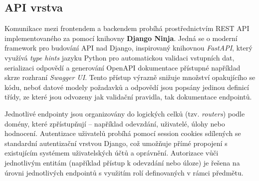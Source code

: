 \subsection{API vrstva}
\label{subsec:kelvin-api}

Komunikace mezi frontendem a backendem probíhá prostřednictvím REST API implementovaného za pomocí knihovny \textbf{Django Ninja}.
Jedná se o moderní framework pro budování API nad Django, inspirovaný knihovnou \textit{FastAPI}, který využívá \textit{type hints} jazyku Python pro automatickou validaci vstupních dat, serializaci odpovědí a generování OpenAPI dokumentace přístupné například skrze rozhraní \textit{Swagger UI}\@.
Tento přístup výrazně snižuje množství opakujícího se kódu, neboť datové modely požadavků a odpovědí jsou popsány jedinou definicí třídy, ze které jsou odvozeny jak validační pravidla, tak dokumentace endpointů.

Jednotlivé endpointy jsou organizovány do logických celků (tzv. \textit{routers}) podle domény, které zpřístupňují -- například odevzdání, uživatelé, úlohy nebo hodnocení.
Autentizace uživatelů probíhá pomocí session cookies sdílených se standardní autentizační vrstvou Django, což umožňuje přímé propojení s existujícím systémem uživatelských účtů a oprávnění.
Autorizace vůči jednotlivým entitám (například přístup k odevzdání nebo úloze) je řešena na úrovni jednotlivých endpointů s využitím rolí definovaných v rámci předmětu.

\endinput
